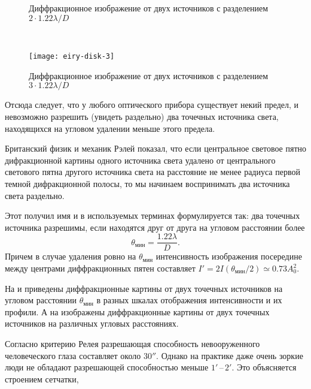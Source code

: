 \begin{figure}[p]
\begin{subcaptionblock}{\tw}
        \caption{Диффракционное изображение от двух источников с разделением~$2 \cdot 1.22\lambda/D$}
    \end{subcaptionblock}\\
    \begin{subcaptionblock}{\tw}
        \texttt{[image: eiry-disk-3]}\hfill
        \caption{Диффракционное изображение от двух источников с разделением~$3 \cdot 1.22\lambda/D$}
    \end{subcaptionblock}
    \caption{}
    \label{pic:eiry-disk}
\end{figure}

Отсюда следует, что у любого оптического прибора существует некий предел, и невозможно разрешить (увидеть раздельно) два точечных источника света, находящихся на угловом удалении меньше этого предела. 

Британский физик и механик Рэлей показал, что если центральное световое пятно дифракционной картины одного источника света удалено от центрального светового пятна другого источника света на расстояние не менее радиуса первой темной дифракционной полосы, то мы начинаем воспринимать два источника света раздельно.

Этот  получил имя  и в используемых терминах формулируется так: два точечных источника разрешимы, если находятся друг от друга на угловом расстоянии более
\begin{equation}
    \theta_\text{мин} = \frac{1.22 \lambda}{D}.
\end{equation}
Причем в случае удаления ровно на $\theta_\text{мин}$ интенсивность изображения  посередине между центрами диффракционных пятен составляет $I' = 2 I(\theta_\text{мин} / 2) \simeq 0.73 A_0^2$.

На  и  приведены диффракционные картины от двух точечных источников на угловом расстоянии $\theta_\text{мин}$ в разных шкалах отображения интенсивности и их профили. А на  изображены диффракционные картины от двух точечных источников на различных угловых расстояниях.

Согласно критерию Релея разрешающая способность невооруженного человеческого глаза составляет около $30''$. Однако на практике даже очень зоркие люди не обладают разрешающей способностью меньше $1'$\,--\,$2'$. Это объясняется строением сетчатки,
